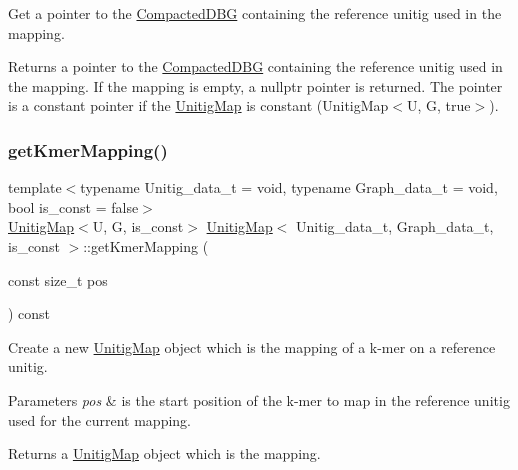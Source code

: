 Get a pointer to the \hyperlink{classCompactedDBG}{Compacted\+D\+BG} containing the reference unitig used in the mapping. 

\begin{DoxyReturn}{Returns}
a pointer to the \hyperlink{classCompactedDBG}{Compacted\+D\+BG} containing the reference unitig used in the mapping. If the mapping is empty, a nullptr pointer is returned. The pointer is a constant pointer if the \hyperlink{classUnitigMap}{Unitig\+Map} is constant (Unitig\+Map$<$\+U, G, true$>$). 
\end{DoxyReturn}
\mbox{\label{classUnitigMap_af12f1d4e121afe7fe8324ddcdc9c6402}} 
\subsubsection{\texorpdfstring{get\+Kmer\+Mapping()}{getKmerMapping()}}
{\footnotesize\ttfamily template$<$typename Unitig\+\_\+data\+\_\+t = void, typename Graph\+\_\+data\+\_\+t = void, bool is\+\_\+const = false$>$ \\
\hyperlink{classUnitigMap}{Unitig\+Map}$<$U, G, is\+\_\+const$>$ \hyperlink{classUnitigMap}{Unitig\+Map}$<$ Unitig\+\_\+data\+\_\+t, Graph\+\_\+data\+\_\+t, is\+\_\+const $>$\+::get\+Kmer\+Mapping (\begin{DoxyParamCaption}\item[{const size\+\_\+t}]{pos }\end{DoxyParamCaption}) const}



Create a new \hyperlink{classUnitigMap}{Unitig\+Map} object which is the mapping of a k-\/mer on a reference unitig. 


\begin{DoxyParams}{Parameters}
{\em pos} & is the start position of the k-\/mer to map in the reference unitig used for the current mapping. \\
\hline
\end{DoxyParams}
\begin{DoxyReturn}{Returns}
a \hyperlink{classUnitigMap}{Unitig\+Map} object which is the mapping. 
\end{DoxyReturn}
\mbox{\label{classUnitigMap_a18a15516e136f787dc70db5030698548}} 
